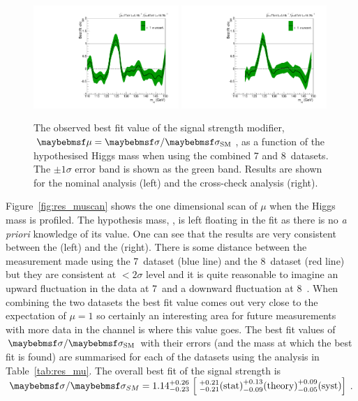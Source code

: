 \begin{figure}
  \includegraphics[width=0.49\textwidth]{results/plots/mva_greenband.pdf}
  \includegraphics[width=0.49\textwidth]{results/plots/sideband_greenband.pdf}
  \caption[The observed best fit value of the signal strength modifier $\mu$]{The observed best fit value of the signal strength modifier, $\mu=\musm$, as a function of the hypothesised Higgs mass \mH when using the combined 7 and 8~\TeV datasets. The $\pm1\sigma$ error band is shown as the green band. Results are shown for the nominal \MFM analysis (left) and the cross-check \SMVA analysis (right).}
  \label{fig:res_mumh}
\end{figure}

Figure~\ref{fig:res_muscan} shows the one dimensional \NLL scan of $\mu$ when the Higgs mass \mH is profiled. The hypothesis mass, \mH, is left floating in the fit as there is no \textit{a priori} knowledge of its value. One can see that the results are very consistent between the \MFM (left) and the \SMVA (right). There is some distance between the measurement made using the 7~\TeV dataset (blue line) and the 8~\TeV dataset (red line) but they are consistent at $<2\sigma$ level and it is quite reasonable to imagine an upward fluctuation in the data at 7~\TeV and a downward fluctuation at 8~\TeV. When combining the two datasets the best fit value comes out very close to the \SM expectation of $\mu=1$ so certainly an interesting area for future measurements with more data in the \Hgg channel is where this value goes. The best fit values of $\musm$ with their errors (and the mass at which the best fit is found) are summarised for each of the datasets using the \MFM analysis in Table~\ref{tab:res_mu}. The overall best fit of the signal strength is $\sigma/\sigma_{SM} = 1.14^{+0.26}_{-0.23} \;\Bigl[\;^{+0.21}_{-0.21} \mathrm{(stat)} ^{+0.13}_{-0.09} \mathrm{(theory)} ^{+0.09}_{-0.05} \mathrm{(syst)} \Bigr]$.


